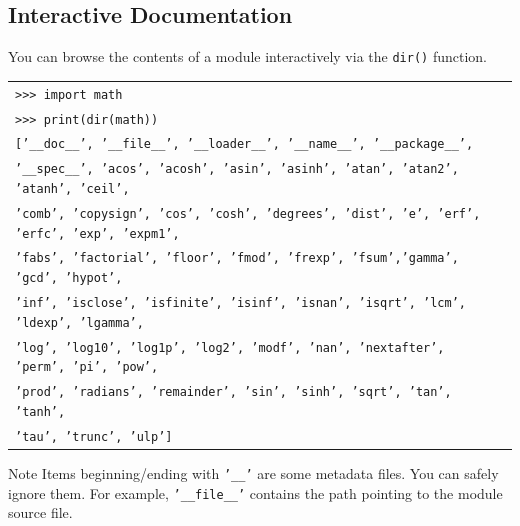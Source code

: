 \documentclass[t,handout,9pt]{beamer}
\begin{document}
\subsection{Interactive Documentation}
\begin{frame}
You can browse the contents of a module interactively via the \texttt{dir()} function.
\vfill
\begin{table}[]
\begin{flushleft}
\begin{tabular}{ll}
\texttt{>{}>{}> import math}        & \\
\texttt{>{}>{}> print(dir(math))}        & \\
\texttt{['\_\_doc\_\_', '\_\_file\_\_', '\_\_loader\_\_', '\_\_name\_\_', '\_\_package\_\_',}        &\\
\texttt{'\_\_spec\_\_', 'acos', 'acosh', 'asin', 'asinh', 'atan', 'atan2', 'atanh', 'ceil',}        &\\
\texttt{'comb', 'copysign', 'cos', 'cosh', 'degrees', 'dist', 'e', 'erf', 'erfc', 'exp', 'expm1',}        &\\
\texttt{'fabs', 'factorial', 'floor', 'fmod', 'frexp', 'fsum','gamma', 'gcd', 'hypot',}        &\\
\texttt{'inf', 'isclose', 'isfinite', 'isinf', 'isnan', 'isqrt', 'lcm', 'ldexp', 'lgamma',}        &\\
\texttt{'log', 'log10', 'log1p', 'log2', 'modf', 'nan', 'nextafter', 'perm', 'pi', 'pow',}        &\\
\texttt{'prod', 'radians', 'remainder', 'sin', 'sinh', 'sqrt', 'tan', 'tanh',}        &\\
\texttt{'tau', 'trunc', 'ulp']}        &\\
\end{tabular}
\end{flushleft}
\end{table}
\vfill
\begin{block}{Note}
Items beginning/ending with \texttt{'\_\_'} are some metadata files. You can safely ignore them. For example, \texttt{'\_\_file\_\_'} contains the path pointing to the module source file.
\end{block}
\vfill
\end{frame}
%
\end{document}
